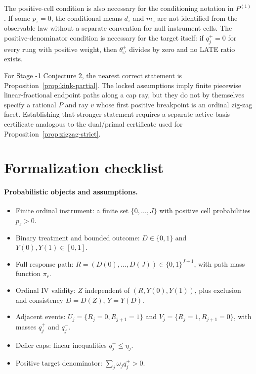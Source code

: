 \documentclass[11pt]{article}
\theoremstyle{definition}
\theoremstyle{plain}
\theoremstyle{remark}
\begin{document}
The positive-cell condition is also necessary for the conditioning notation in
\(P^{(1)}\).  If some \(p_z=0\), the conditional means \(d_z\) and \(m_z\) are
not identified from the observable law without a separate convention for null
instrument cells.  The positive-denominator condition is necessary for the
target itself: if \(q_j^+=0\) for every rung with positive weight, then
\(\theta^+_\omega\) divides by zero and no LATE ratio exists.

For Stage -1 Conjecture 2, the nearest correct statement is
Proposition~\ref{prop:kink-partial}.  The locked assumptions imply finite
piecewise linear-fractional endpoint paths along a cap ray, but they do not by
themselves specify a rational \(P\) and ray \(v\) whose first positive
breakpoint is an ordinal zig-zag facet.  Establishing that stronger statement
requires a separate active-basis certificate analogous to the dual/primal
certificate used for Proposition~\ref{prop:zigzag-strict}.

\section{Formalization checklist}
\paragraph{Probabilistic objects and assumptions.}
\begin{itemize}[leftmargin=*]
\item Finite ordinal instrument: a finite set \(\{0,\ldots,J\}\) with
positive cell probabilities \(p_z>0\).
\item Binary treatment and bounded outcome: \(D\in\{0,1\}\) and
\(Y(0),Y(1)\in[0,1]\).
\item Full response path: \(R=(D(0),\ldots,D(J))\in\{0,1\}^{J+1}\), with path
mass function \(\pi_r\).
\item Ordinal IV validity: \(Z\) independent of \((R,Y(0),Y(1))\), plus
exclusion and consistency \(D=D(Z)\), \(Y=Y(D)\).
\item Adjacent events: \(U_j=\{R_j=0,R_{j+1}=1\}\) and
\(V_j=\{R_j=1,R_{j+1}=0\}\), with masses \(q_j^+\) and \(q_j^-\).
\item Defier caps: linear inequalities \(q_j^-\le\eta_j\).
\item Positive target denominator:
\(\sum_j\omega_j q_j^+>0\).
\end{itemize}
\end{document}
